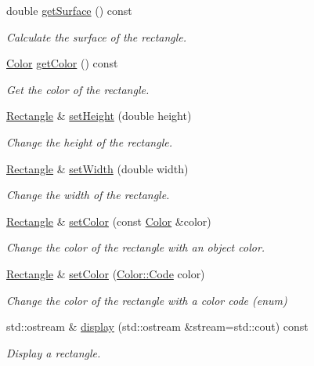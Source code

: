 \begin{DoxyCompactItemize}
double \hyperlink{classRectangle_addf6cfd9097d92677f6a76f591b88e22}{get\+Surface} () const
\begin{DoxyCompactList}\small\item\em Calculate the surface of the rectangle. \end{DoxyCompactList}\item 
\hyperlink{classColor}{Color} \hyperlink{classRectangle_a9bd050cc586a325ed98c83245bb7b7e6}{get\+Color} () const
\begin{DoxyCompactList}\small\item\em Get the color of the rectangle. \end{DoxyCompactList}\item 
\hyperlink{classRectangle}{Rectangle} \& \hyperlink{classRectangle_ac4d4ed333eff18fe9bc790a9d9fe5af5}{set\+Height} (double height)
\begin{DoxyCompactList}\small\item\em Change the height of the rectangle. \end{DoxyCompactList}\item 
\hyperlink{classRectangle}{Rectangle} \& \hyperlink{classRectangle_a52dd37288586383161274d0b6ec5b7f7}{set\+Width} (double width)
\begin{DoxyCompactList}\small\item\em Change the width of the rectangle. \end{DoxyCompactList}\item 
\hyperlink{classRectangle}{Rectangle} \& \hyperlink{classRectangle_adbc9fb0c86095b3245bc5b38ba9619a6}{set\+Color} (const \hyperlink{classColor}{Color} \&color)
\begin{DoxyCompactList}\small\item\em Change the color of the rectangle with an object color. \end{DoxyCompactList}\item 
\hyperlink{classRectangle}{Rectangle} \& \hyperlink{classRectangle_a684b70cefa746172e045702d2e0bdf08}{set\+Color} (\hyperlink{classColor_a20a7b04657c1d83fae5d54514d3f1622}{Color\+::\+Code} color)
\begin{DoxyCompactList}\small\item\em Change the color of the rectangle with a color code (enum) \end{DoxyCompactList}\item 
std\+::ostream \& \hyperlink{classRectangle_a5b1284a98460b547941ba6ca62ea8ac7}{display} (std\+::ostream \&stream=std\+::cout) const
\begin{DoxyCompactList}\small\item\em Display a rectangle. \end{DoxyCompactList}\end{DoxyCompactItemize}


